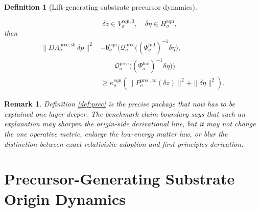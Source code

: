 \documentclass[11pt]{article}
\newcommand{\EqnPair}[1]{\mathfrak b_{#1}^{\mathrm{eqn}}}
\newcommand{\EqnHidden}[1]{H_{#1}^{\mathrm{eqn}}}
\newcommand{\EqnZero}[1]{V_{#1}^{\mathrm{eqn},0}}
\newcommand{\HiddenChart}[1]{\Psi_{#1}^{\mathrm{hid}}}
\newcommand{\PrecShellMap}[1]{\Lambda_{#1}^{\mathrm{prec,sh}}}
\newcommand{\PrecCharge}[1]{\mathcal Q_{#1}^{\mathrm{prec}}}
\newcommand{\PrecStateComp}[1]{P_{#1}^{\mathrm{prec,co}}}
\newtheorem{definition}{Definition}
\newtheorem{remark}{Remark}
\begin{document}
\begin{definition}[Lift-generating substrate precursor dynamics]
\begin{enumerate}
\[    \qquad
    \delta z\in\EqnZero{\sigma},
    \quad
    \delta\eta\in\EqnHidden{\sigma},
    \]
    then
    \begin{equation}
    \begin{aligned}
    \|D\PrecShellMap{\sigma}\,\delta p\|^{2}
    &+
    \EqnPair{\sigma}\bigl(
    \PrecCharge{\sigma}\bigl((\HiddenChart{\sigma})^{-1}\delta\eta\bigr),\\
    &\qquad
    \PrecCharge{\sigma}\bigl((\HiddenChart{\sigma})^{-1}\delta\eta\bigr)
    \bigr)
    \\
    &\ge
    \kappa_{\sigma}^{\mathrm{eqn}}
    \left(
    \|\PrecStateComp{\sigma}(\delta z)\|^{2}
    +
    \|\delta\eta\|^{2}
    \right).
    \end{aligned}
    \label{eq:preccoercive}
    \end{equation}
\end{enumerate}
\end{definition}

\begin{remark}
Definition \ref{def:prec} is the precise package that now has to be explained one layer deeper. The benchmark claim boundary says that such an explanation may sharpen the origin-side derivational line, but it may not change the one operative metric, enlarge the low-energy matter law, or blur the distinction between exact relativistic adoption and first-principles derivation.
\end{remark}

\section{Precursor-Generating Substrate Origin Dynamics}
\end{document}
